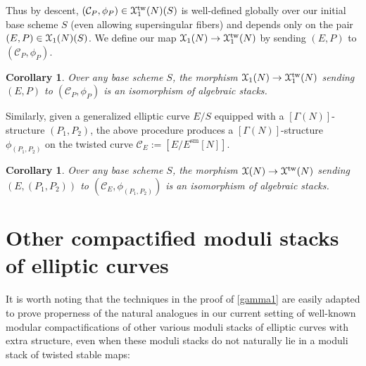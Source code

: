 \documentclass[11pt]{amsart}
\newtheorem{corollary}[subsection]{Corollary}
\theoremstyle{definition}
\begin{document}
Thus by descent, $({\mathcal{C}}_P, \phi_P) \in {\mathbf{\EuScript{X}}}^{\mathrm{tw}}_1(N)(S)$ is well-defined globally over our initial base scheme $S$ (even allowing supersingular fibers) and depends only on the pair $(E,P) \in {\mathbf{\EuScript{X}}}_1(N)(S)$. We define our map ${\mathbf{\EuScript{X}}}_1(N) \rightarrow {\mathbf{\EuScript{X}}}^{\mathrm{tw}}_1(N)$ by sending $(E,P)$ to $({\mathcal{C}}_P, \phi_P)$. 
\begin{corollary}\label{modular1}
Over any base scheme $S$, the morphism ${\mathbf{\EuScript{X}}}_1(N) \rightarrow {\mathbf{\EuScript{X}}}^{\mathrm{tw}}_1(N)$ sending $(E,P)$ to $({\mathcal{C}}_P, \phi_P)$ is an isomorphism of algebraic stacks.
\end{corollary}

Similarly, given a generalized elliptic curve $E/S$ equipped with a $[\Gamma(N)]$-structure $(P_1,P_2)$, the above procedure produces a $[\Gamma(N)]$-structure $\phi_{(P_1,P_2)}$ on the twisted curve ${\mathcal{C}}_E := [E/E^{\mathrm{sm}}[N]]$.

\begin{corollary}\label{modular2}
Over any base scheme $S$, the morphism ${\mathbf{\EuScript{X}}}(N) \rightarrow {\mathbf{\EuScript{X}}}^{\mathrm{tw}}(N)$ sending $(E,(P_1,P_2))$ to $({\mathcal{C}}_E, \phi_{(P_1,P_2)})$ is an isomorphism of algebraic stacks.
\end{corollary}

\section{Other compactified moduli stacks of elliptic curves}
It is worth noting that the techniques in the proof of \ref{gamma1} are easily adapted to prove properness of the natural analogues in our current setting of well-known modular compactifications of other various moduli stacks of elliptic curves with extra structure, even when these moduli stacks do not naturally lie in a moduli stack of twisted stable maps:
\end{document}
